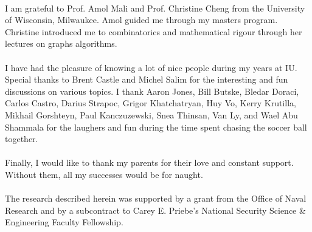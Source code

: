 \\
%
\noindent I am grateful to Prof. Amol Mali and Prof. Christine Cheng from the
University of Wisconsin, Milwaukee. Amol guided me through my masters
program. Christine introduced me to combinatorics and mathematical
rigour through her lectures on graphs algorithms. \\ \\
%
\noindent I have had the pleasure of knowing a lot of nice people during my
years at IU. Special thanks to Brent Castle and Michel Salim for the
interesting and fun discussions on various topics. I thank Aaron
Jones, Bill Butske, Bledar Doraci, Carlos Castro, Darius Strapoc,
Grigor Khatchatryan, Huy Vo, Kerry Krutilla, Mikhail Gorshteyn, Paul
Kanczuzewski, Snea Thinsan, Van Ly, and Wael Abu Shammala for the
laughers and fun during the time spent chasing the soccer ball
together. \\ \\
%
\noindent Finally, I would like to thank my parents for their love and 
constant support. Without them, all my successes would be for
naught. \\ \\
%
\noindent The research described herein was supported by a grant from the Office
of Naval Research and by a subcontract to Carey E. Priebe's National
Security Science \& Engineering Faculty Fellowship.
